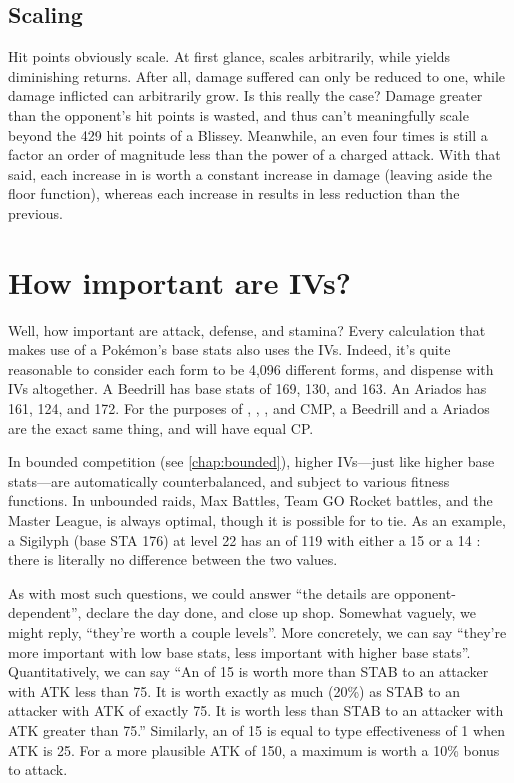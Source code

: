 \subsection{Scaling\label{subsec:scaling}}
Hit points obviously scale.
At first glance,  scales arbitrarily, while  yields diminishing returns.
After all, damage suffered can only be reduced to one, while damage inflicted
 can arbitrarily grow.
Is this really the case?
Damage greater than the opponent's hit points is wasted, and thus can't meaningfully scale
 beyond the 429 hit points of a  Blissey.
Meanwhile, an  even four times  is still a factor an order of magnitude
 less than the power of a charged attack.
With that said, each increase in  is worth a constant increase in
 damage (leaving aside the floor function), whereas each increase in 
 results in less reduction than the previous.

\section{How important are IVs?}
Well, how important are attack, defense, and stamina?
Every calculation that makes use of a Pokémon's base stats also uses the IVs.
Indeed, it's quite reasonable to consider each form to be 4,096 different forms,
 and dispense with IVs altogether.
A Beedrill has base stats of 169, 130, and 163.
An Ariados has 161, 124, and 172.
For the purposes of , , \MHP, and CMP, a  Beedrill
 and a  Ariados are the exact same thing, and will have equal CP.

In bounded competition (see \autoref{chap:bounded}), higher IVs---just like higher
  base stats---are automatically counterbalanced, and subject to various fitness functions.
In unbounded raids, Max Battles, Team GO Rocket battles, and the Master League,
   is always optimal, though it is possible for  to tie.
As an example, a Sigilyph (base STA 176) at level 22 has an \MHP{} of 119 with
  either a 15 or a 14 : there is literally no difference between the two values.

As with most such questions, we could answer ``the details are opponent-dependent'',
  declare the day done, and close up shop.
Somewhat vaguely, we might reply, ``they're worth a couple levels''.
More concretely, we can say ``they're more important with low base stats, less important
  with higher base stats''.
Quantitatively, we can say ``An  of 15 is worth more than STAB to an
  attacker with ATK less than 75. It is worth exactly as much (20\%) as STAB
  to an attacker with ATK of exactly 75. It is worth less than STAB
  to an attacker with ATK greater than 75.''
Similarly, an  of 15 is equal to type effectiveness of 1 when ATK is 25.
For a more plausible ATK of 150, a maximum  is worth a 10\% bonus to attack.

